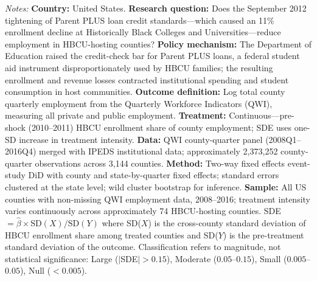 \begin{table}[t]
\begin{threeparttable}
\begin{tablenotes}
\item \textit{Notes:} \textbf{Country:} United States. \textbf{Research question:} Does the September 2012 tightening of Parent PLUS loan credit standards---which caused an 11\% enrollment decline at Historically Black Colleges and Universities---reduce employment in HBCU-hosting counties? \textbf{Policy mechanism:} The Department of Education raised the credit-check bar for Parent PLUS loans, a federal student aid instrument disproportionately used by HBCU families; the resulting enrollment and revenue losses contracted institutional spending and student consumption in host communities. \textbf{Outcome definition:} Log total county quarterly employment from the Quarterly Workforce Indicators (QWI), measuring all private and public employment. \textbf{Treatment:} Continuous---pre-shock (2010--2011) HBCU enrollment share of county employment; SDE uses one-SD increase in treatment intensity. \textbf{Data:} QWI county-quarter panel (2008Q1--2016Q4) merged with IPEDS institutional data; approximately 2,373,252 county-quarter observations across 3,144 counties. \textbf{Method:} Two-way fixed effects event-study DiD with county and state-by-quarter fixed effects; standard errors clustered at the state level; wild cluster bootstrap for inference. \textbf{Sample:} All US counties with non-missing QWI employment data, 2008--2016; treatment intensity varies continuously across approximately 74 HBCU-hosting counties. SDE $= \hat{\beta} \times \text{SD}(X) / \text{SD}(Y)$ where SD($X$) is the cross-county standard deviation of HBCU enrollment share among treated counties and SD($Y$) is the pre-treatment standard deviation of the outcome. Classification refers to magnitude, not statistical significance: Large ($|$SDE$| > 0.15$), Moderate ($0.05$--$0.15$), Small ($0.005$--$0.05$), Null ($< 0.005$).
\end{tablenotes}
\end{threeparttable}
\end{table}
